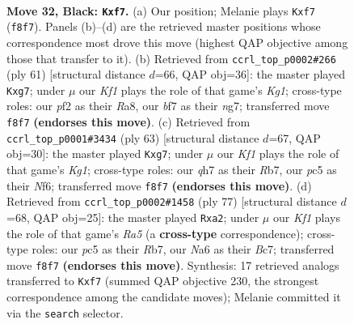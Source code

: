 \documentclass[11pt]{article}
\begin{document}
\clearpage

\begin{figure}[p]\centering
\begin{subfigure}{0.46\textwidth}\centering
\resizebox{\linewidth}{!}{%
\newchessgame
\chessboard[
  setfen={r4k2/pp3BpQ/n4P2/2P3B1/8/P5P1/1P3P2/2R1R1K1 b - - 0 32},
  showmover=false,
  pgfstyle=straightmove, color=movearrow, markmove={f8-f7}
]}
\caption{}
\end{subfigure}\hfill
\begin{subfigure}{0.46\textwidth}\centering
\resizebox{\linewidth}{!}{%
\newchessgame
\chessboard[
  setfen={r3r1k1/n5N1/5p2/p1P4p/1p6/BP2P1P1/1P5P/2RR1K2 b - - 0 31},
  showmover=false,
  pgfstyle=straightmove, color=movearrow, markmove={g8-g7}
]}
\caption{}
\end{subfigure}
\\[4pt]
\begin{subfigure}{0.46\textwidth}\centering
\resizebox{\linewidth}{!}{%
\newchessgame
\chessboard[
  setfen={r5k1/1r3pB1/p4n2/4p3/PP6/7P/2B2Pb1/R3R1K1 b - - 0 32},
  showmover=false,
  pgfstyle=straightmove, color=movearrow, markmove={g8-g7}
]}
\caption{}
\end{subfigure}\hfill
\begin{subfigure}{0.46\textwidth}\centering
\resizebox{\linewidth}{!}{%
\newchessgame
\chessboard[
  setfen={7k/1rb3p1/5p1p/1P6/r1nBP3/4N2P/R4PP1/R5K1 b - - 0 39},
  showmover=false,
  pgfstyle=straightmove, color=movearrow, markmove={a4-a2}
]}
\caption{}
\end{subfigure}
\caption{\textbf{Move 32, Black: \texttt{Kxf7}.} (a) Our position; Melanie plays \texttt{Kxf7} (\texttt{f8f7}). Panels (b)--(d) are the retrieved master positions whose correspondence most drove this move (highest QAP objective among those that transfer to it). (b) Retrieved from \texttt{ccrl\_top\_p0002\#266} (ply 61) [structural distance $d$=66, QAP obj=36]: the master played \texttt{Kxg7}; under $\mu$ our \emph{Kf1} plays the role of that game's \emph{Kg1}; cross-type roles: our \emph{p}f2 as their \emph{R}a8, our \emph{b}f7 as their \emph{n}g7; transferred move \texttt{f8f7} \textbf{(endorses this move)}. (c) Retrieved from \texttt{ccrl\_top\_p0001\#3434} (ply 63) [structural distance $d$=67, QAP obj=30]: the master played \texttt{Kxg7}; under $\mu$ our \emph{Kf1} plays the role of that game's \emph{Kg1}; cross-type roles: our \emph{q}h7 as their \emph{R}b7, our \emph{p}c5 as their \emph{N}f6; transferred move \texttt{f8f7} \textbf{(endorses this move)}. (d) Retrieved from \texttt{ccrl\_top\_p0002\#1458} (ply 77) [structural distance $d$=68, QAP obj=25]: the master played \texttt{Rxa2}; under $\mu$ our \emph{Kf1} plays the role of that game's \emph{Ra5} (a \textbf{cross-type} correspondence); cross-type roles: our \emph{p}c5 as their \emph{R}b7, our \emph{N}a6 as their \emph{B}c7; transferred move \texttt{f8f7} \textbf{(endorses this move)}. Synthesis: 17 retrieved analogs transferred to \texttt{Kxf7} (summed QAP objective 230, the strongest correspondence among the candidate moves); Melanie committed it via the \texttt{search} selector.}
\label{fig:thought-m63}
\end{figure}
\end{document}
